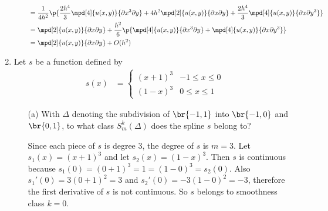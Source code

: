 \documentclass[11pt]{article}
\begin{document}
\begin{enumerate}
\begin{enumerate}
\begin{align*}
                &= \frac{1}{4h^2} \p{\frac{2h^4}{3}
                    \mpd[4]{u(x,y)}{\partial x^3 \partial y} + 
                    4h^2 \mpd[2]{u(x,y)}{\partial x \partial y} + \frac{2h^4}{3}
                    \mpd[4]{u(x,y)}{\partial x \partial y^3}} \\
                &= \mpd[2]{u(x,y)}{\partial x \partial y} + \frac{h^2}{6} 
                    \p{\mpd[4]{u(x,y)}{\partial x^3 \partial y} + 
                    \mpd[4]{u(x,y)}{\partial x \partial y^3}}\\
                &= \mpd[2]{u(x,y)}{\partial x \partial y} + O(h^2)
            \end{align*}
    \end{enumerate}

    \item Let $s$ be a function defined by
        \begin{align*}
            s(x) &=
            \begin{cases}
                (x + 1)^3 & -1 \le x \le 0 \\
                (1 - x)^3 & 0 \le x \le 1
            \end{cases}
        \end{align*}
    \begin{enumerate}
        \item[(a)]
            With $\Delta$ denoting the subdivision of $\br{-1,1}$ into
            $\br{-1, 0}$ and $\br{0, 1}$, to what class $S_m^k(\Delta)$
            does the spline $s$ belong to?

            Since each piece of $s$ is degree 3, the degree of $s$ is $m = 3$.
            Let $s_1(x) = (x + 1)^3$ and let $s_2(x) = (1-x)^3$.
            Then $s$ is continuous because $s_1(0) = (0 + 1)^3 = 1 = (1 - 0)^3
            = s_2(0)$.
            Also $s_1'(0) = 3(0 + 1)^2 = 3$ and $s_2'(0) = -3(1 - 0)^2 = -3$,
            therefore the first derivative of $s$ is not continuous.
            So $s$ belongs to smoothness class $k=0$.


\end{enumerate}
\end{enumerate}
\end{document}
